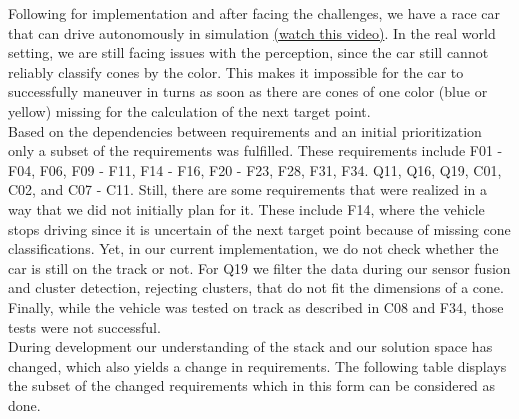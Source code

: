 
Following for implementation and after facing the challenges, we have a race car that can drive autonomously in simulation \href{https://www.youtube.com/watch?v=qzKs0KKohVE&ab_channel=Ossmos}{(watch this video)}. In the real world setting, we are still facing issues with the perception, since the car still cannot reliably classify cones by the color. This makes it impossible for the car to successfully maneuver in turns as soon as there are cones of one color (blue or yellow) missing for the calculation of the next target point. \\ \newline
Based on the dependencies between requirements and an initial prioritization  only a subset of the requirements was fulfilled. These requirements include F01 - F04, F06, F09 - F11, F14 - F16, F20 - F23, F28, F31, F34. Q11, Q16, Q19, C01, C02, and C07 - C11. Still, there are some requirements that were realized in a way that we did not initially plan for it. These include F14, where the vehicle stops driving since it is uncertain of the next target point because of missing cone classifications. Yet, in our current implementation, we do not check whether the car is still on the track or not. For Q19 we filter the data during our sensor fusion and cluster detection, rejecting clusters, that do not fit the dimensions of a cone. Finally, while the vehicle was tested on track as described in C08 and F34, those tests were not successful. \\
\newline
During development our understanding of the stack and our solution space has changed, which also yields a change in requirements. The following table displays the subset of the changed requirements which in this form can be considered as done. \\

